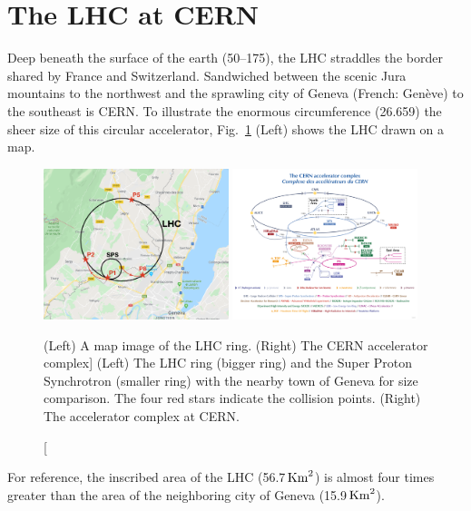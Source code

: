 \section{The LHC at CERN}
Deep beneath the surface of the earth (50--175\meter), the LHC straddles the border shared by France and Switzerland.
Sandwiched between the scenic Jura mountains to the northwest and the sprawling city of Geneva (French: Genève) to the southeast is CERN. %
To illustrate the enormous circumference (26.659\Km) the sheer size of this circular accelerator, Fig.~\ref{fig:lhc_on_map_and_complex} (Left) shows the LHC drawn on a map.
\begin{figure}[pbth]
    \centering
    \includegraphics[width=0.48\textwidth,keepaspectratio]{figures/lhc/lhc_drawn_on_map_withpoints.png}
    \includegraphics[width=0.48\textwidth,keepaspectratio]{figures/lhc/cern_complex.png}
        \caption
            [(Left) A map image of the LHC ring. (Right) The CERN accelerator complex]
            {
            (Left) The LHC ring (bigger ring) and the Super Proton Synchrotron (smaller ring) with the nearby town of Geneva for size comparison. 
            The four red stars indicate the \pp collision points. 
            (Right) The accelerator complex at CERN.
            } 
        \label{fig:lhc_on_map_and_complex}
    \end{figure}
For reference, the inscribed area of the LHC (56.7$\,\text{Km}^{2}$) is almost four times greater than the area of the neighboring city of Geneva (15.9$\,\text{Km}^{2}$).

